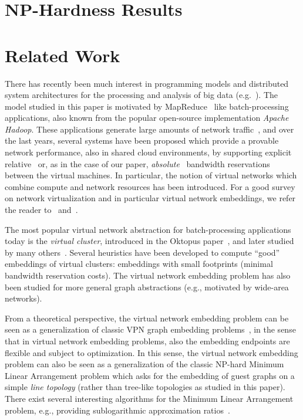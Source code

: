 \documentclass[9pt,twocolumn]{scrartcl}
\begin{document}


\section{NP-Hardness Results}\label{sec:np}




\section{Related Work}\label{sec:relwork}

There has recently been much interest in programming models and distributed
system architectures for the processing and analysis of big data (e.g.~\cite{nodb,mapreduce,shark}). The model studied in
this paper is motivated by MapReduce~\cite{mapreduce} like batch-processing applications, also known
from the popular open-source implementation \emph{Apache Hadoop}.
These applications
generate large amounts of network traffic~\cite{orchestra,talk-about,amazonbw},
and over the last years, several systems have been proposed which provide
a provable network performance, also in shared cloud environments, by supporting explicit
relative~\cite{seawall,faircloud,elasticswitch}
or, as in the case of our paper, \emph{absolute}~\cite{secondnet,oktopus,proteus,drl,gatekeeper} bandwidth reservations
between the virtual machines.
In particular, the notion of virtual networks which combine compute and network resources has been introduced.
For a good survey on network virtualization and in particular virtual network embeddings,
we refer the reader to~\cite{boutaba-survey} and~\cite{fischer-survey}.

The most popular virtual network abstraction for batch-processing applications today is the \emph{virtual cluster},
introduced in the Oktopus paper~\cite{oktopus}, and later studied by many others~\cite{talk-about,proteus}.
Several heuristics have been developed to compute ``good'' embeddings of virtual clusters: embeddings
with small footprints (minimal bandwidth reservation costs).\cite{oktopus,talk-about,proteus}
The virtual network embedding problem has also been studied for more general graph abstractions
(e.g., motivated by wide-area networks).~\cite{turner,ammar,infocom2009,zhu06,simannealing,ucc12mip}

From a theoretical perspective, the virtual network embedding problem can be seen as a generalization
of classic VPN graph embedding problems~\cite{Goyal2008,gupta2001provisioning},
in the sense that in virtual network embedding problems, also the embedding endpoints are flexible and subject to optimization.
In this sense, the virtual network embedding problem can also be seen as a generalization of the
classic NP-hard Minimum Linear Arrangement problem which asks for the
embedding of guest graphs on a simple \emph{line topology} (rather than tree-like topologies as
studied in this paper).~\cite{mla,mla-survey}
There exist several interesting algorithms for the Minimum Linear Arrangement problem,
e.g., providing sublogarithmic approximation ratios~\cite{mla-feige}.
\end{document}
